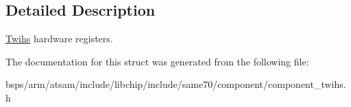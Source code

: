 \subsection{Detailed Description}
\mbox{\hyperlink{structTwihs}{Twihs}} hardware registers. 

The documentation for this struct was generated from the following file\+:\begin{DoxyCompactItemize}
\item 
bsps/arm/atsam/include/libchip/include/same70/component/component\+\_\+twihs.\+h\end{DoxyCompactItemize}

